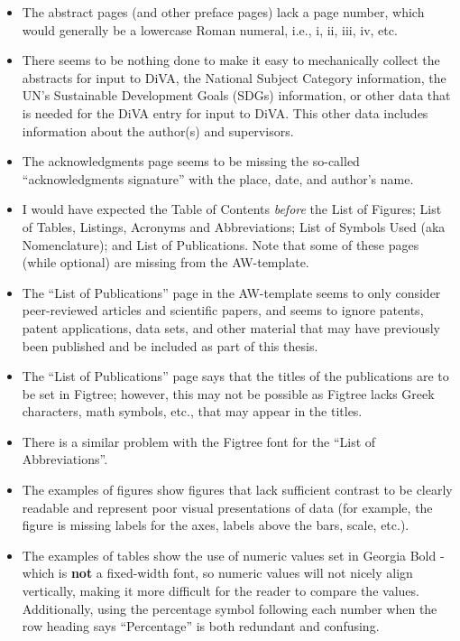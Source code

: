\documentclass[12pt, twoside]{article}
\begin{document}
\clearpage
\begin{itemize}[resume*, label=\color{red}]
\item The abstract pages (and other preface pages) lack a page number, which would generally be a lowercase Roman numeral, i.e., i, ii, iii, iv, etc.

\item There seems to be nothing done to make it easy to mechanically collect the abstracts for input to DiVA, the National Subject Category information, the UN's Sustainable Development Goals (SDGs) information, or other data that is needed for the DiVA entry for input to DiVA. This other data includes information about the author(s) and supervisors.

\item The acknowledgments page seems to be missing the so-called ``acknowledgments signature'' with the place, date, and author's name.

\item I would have expected the Table of Contents \textit{before} the List of Figures; List of Tables, Listings, Acronyms and Abbreviations; List of Symbols Used (aka Nomenclature); and List of Publications. Note that some of these pages (while optional) are missing from the AW-template.

\item The ``List of Publications'' page in the AW-template seems to only consider peer-reviewed articles and scientific papers, and seems to ignore patents, patent applications, data sets, and other material that may have previously been published and be included as part of this thesis.

\item The ``List of Publications'' page says that the titles of the publications are to be set in Figtree; however, this may not be possible as Figtree lacks Greek characters, math symbols, etc., that may appear in the titles.

\item There is a similar problem with the Figtree font for the ``List of
Abbreviations''.

\item The examples of figures show figures that lack sufficient contrast to be clearly readable and represent poor visual presentations of data (for example, the figure is missing labels for the axes, labels above the bars, scale, etc.).

\item The examples of tables show the use of numeric values set in Georgia Bold - which is \textbf{not} a fixed-width font, so numeric values will not nicely align vertically, making it more difficult for the reader to compare the values. Additionally, using the percentage symbol following each number when the row heading says ``Percentage'' is both redundant and confusing.
\end{itemize}
\end{document}
